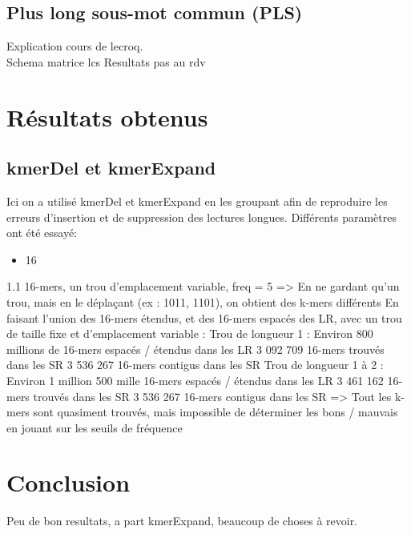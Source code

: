 \documentclass{report}
\begin{document}
    \section{Plus long sous-mot commun (PLS)}
      Explication cours de lecroq.\\
      Schema matrice lcs
      Resultats pas au rdv
    \newpage
  \chapter{Résultats obtenus}
    \section{kmerDel et kmerExpand}
      Ici on a utilisé kmerDel et kmerExpand en les groupant afin de reproduire les erreurs d'insertion et de suppression des lectures longues. Différents paramètres ont été essayé:
      \begin{itemize}
        \item 16
      \end{itemize}
  1.1 16-mers, un trou d’emplacement variable, freq = 5
=> En ne gardant qu’un trou, mais en le déplaçant (ex : 1011, 1101), on obtient des
k-mers différents
En faisant l’union des 16-mers étendus, et des 16-mers espacés des LR, avec un trou
de taille fixe et d’emplacement variable :
Trou de longueur 1 :
Environ 800 millions de 16-mers espacés / étendus dans les LR
3 092 709 16-mers trouvés dans les SR
3 536 267 16-mers contigus dans les SR
Trou de longueur 1 à 2 :
Environ 1 million 500 mille 16-mers espacés / étendus dans les LR
3 461 162 16-mers trouvés dans les SR
3 536 267 16-mers contigus dans les SR
=> Tout les k-mers sont quasiment trouvés, mais impossible de déterminer les bons /
mauvais en jouant sur les seuils de fréquence
  \chapter{Conclusion}
    Peu de bon resultats, a part kmerExpand, beaucoup de choses à revoir.
    \newpage
  
  
\end{document}
